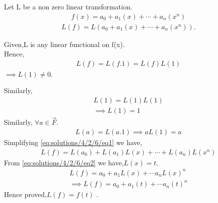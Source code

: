 Let L be a non  zero linear transformation.
\begin{align}
    f(x)=a_0+a_1(x)+\cdots+a_n(x^n)
\end{align}
\begin{align}\label{eq:solutions/4/2/6/eq1}
L(f)=L(a_0+a_1(x)+\cdots+a_n(x^n)).
\end{align}

Given,L is any  linear functional on f(x).\\
Hence,
\begin{align}
L(f)=L(f.1)=L(f)L(1)
\end{align}
$\implies L(1)\neq 0$.

Similarly,
\begin{align}
L(1)=L(1)L(1)\\
\implies L(1) =1
\end{align}
Similarly, $\forall a \in \vec{F}$.
\begin{align}\label{eq:solutions/4/2/6/eq2}
    L(a)=L(a.1)
    \implies aL(1)=a
\end{align}
Simplifying \eqref{eq:solutions/4/2/6/eq1} we have,
\begin{align}
L(f)=L(a_0)+L(a_1)L(x)+\cdots+L(a_n)L(x^n)
\end{align}
From \eqref{eq:solutions/4/2/6/eq2} we have,$L(x)=t$.
\begin{align}
 L(f)=a_0+a_1L(x)+\cdots a_nL(x)^n\\
 \implies L(f)=a_0+a_1(t)+\cdots a_n(t)^n
\end{align}
Hence proved,$L(f)=f(t)$ .

   
   

